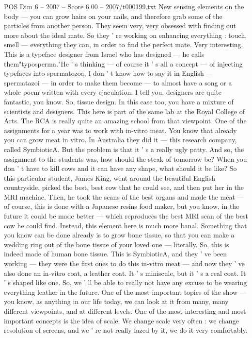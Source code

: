 \begin{textsample}{POS Dim 6 – 2007 – Score 6.00 – 2007/t000199.txt}
New sensing elements on the body — you can grow hairs on your nails, and therefore grab some of the particles from another person.
They seem very, very obsessed with finding out more about the ideal mate.
So they ' re working on enhancing everything : touch, smell — everything they can, in order to find the perfect mate.
Very interesting.
This is a typeface designer from Israel who has designed — he calls them"typosperma."He ' s thinking — of course it ' s all a concept — of injecting typefaces into spermatozoa, I don ' t know how to say it in English — spermatazoi — in order to make them become — to almost have a song or a whole poem written with every ejaculation.
I tell you, designers are quite fantastic, you know.
So, tissue design.
In this case too, you have a mixture of scientists and designers.
This here is part of the same lab at the Royal College of Arts.
The RCA is really quite an amazing school from that viewpoint.
One of the assignments for a year was to work with in-vitro meat.
You know that already you can grow meat in vitro.
In Australia they did it — this research company, called SymbioticA.
But the problem is that it ' s a really ugly patty.
And so, the assignment to the students was, how should the steak of tomorrow be?
When you don ' t have to kill cows and it can have any shape, what should it be like?
So this particular student, James King, went around the beautiful English countryside, picked the best, best cow that he could see, and then put her in the MRI machine.
Then, he took the scans of the best organs and made the meat — of course, this is done with a Japanese resins food maker, but you know, in the future it could be made better — which reproduces the best MRI scan of the best cow he could find.
Instead, this element here is much more banal.
Something that you know can be done already is to grow bone tissue, so that you can make a wedding ring out of the bone tissue of your loved one — literally.
So, this is indeed made of human bone tissue.
This is SymbioticA, and they ' ve been working — they were the first ones to do this in-vitro meat — and now they ' ve also done an in-vitro coat, a leather coat.
It ' s miniscule, but it ' s a real coat.
It ' s shaped like one.
So, we ' ll be able to really not have any excuse to be wearing everything leather in the future.
One of the most important topics of the show — you know, as anything in our life today, we can look at it from many, many different viewpoints, and at different levels.
One of the most interesting and most important concepts is the idea of scale.
We change scale very often : we change resolution of screens, and we ' re not really fazed by it, we do it very comfortably.

\end{textsample}
